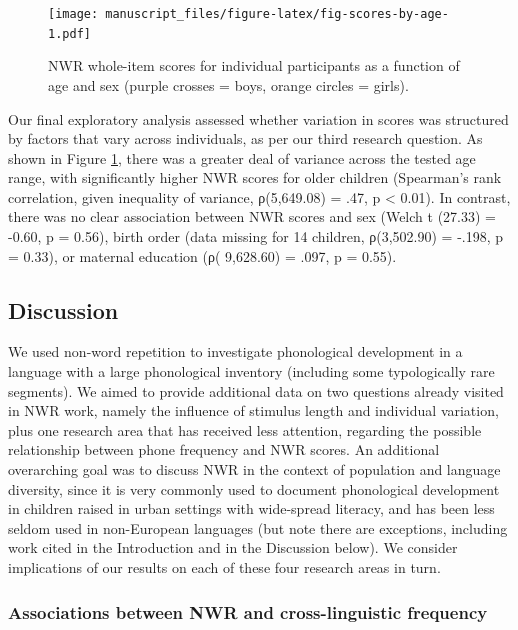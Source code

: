 \documentclass[english,,man,floatsintext]{apa6}
\begin{document}
\begin{figure}
\centering
\texttt{[image: manuscript\_files/figure-latex/fig-scores-by-age-1.pdf]}
\caption{\label{fig:fig-scores-by-age}NWR whole-item scores for individual participants as a function of age and sex (purple crosses = boys, orange circles = girls).}
\end{figure}

Our final exploratory analysis assessed whether variation in scores was structured by factors that vary across individuals, as per our third research question. As shown in Figure \ref{fig:fig-scores-by-age}, there was a greater deal of variance across the tested age range, with significantly higher NWR scores for older children (Spearman's rank correlation, given inequality of variance, ρ(5,649.08) = .47, p \textless{} 0.01). In contrast, there was no clear association between NWR scores and sex (Welch t (27.33) = -0.60, p = 0.56), birth order (data missing for 14 children, ρ(3,502.90) = -.198, p = 0.33), or maternal education (ρ( 9,628.60) = .097, p = 0.55).

\hypertarget{discussion}{%
\subsection{Discussion}\label{discussion}}

We used non-word repetition to investigate phonological development in a language with a large phonological inventory (including some typologically rare segments). We aimed to provide additional data on two questions already visited in NWR work, namely the influence of stimulus length and individual variation, plus one research area that has received less attention, regarding the possible relationship between phone frequency and NWR scores. An additional overarching goal was to discuss NWR in the context of population and language diversity, since it is very commonly used to document phonological development in children raised in urban settings with wide-spread literacy, and has been less seldom used in non-European languages (but note there are exceptions, including work cited in the Introduction and in the Discussion below). We consider implications of our results on each of these four research areas in turn.

\hypertarget{associations-between-nwr-and-cross-linguistic-frequency}{%
\subsubsection{Associations between NWR and cross-linguistic frequency}\label{associations-between-nwr-and-cross-linguistic-frequency}}
\end{document}
